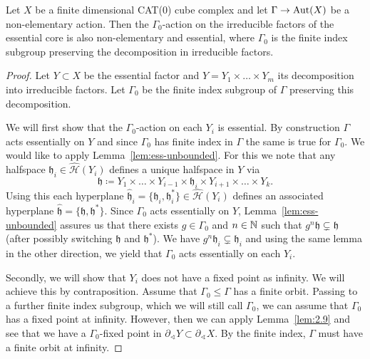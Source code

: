 \begin{lemma}[{\cite[Lemma~2.28]{MR3509968}}]
  \label{lem:2.28}
  Let \(X\) be a finite dimensional CAT(0) cube complex and let \(\Gamma \to \operatorname{Aut}(X)\) be a non-elementary action. Then the \(\Gamma_0\)-action on the irreducible factors of the essential core is also non-elementary and essential, where \(\Gamma_0\) is the finite index subgroup preserving the decomposition in irreducible factors.
\end{lemma}

\begin{proof}
  Let \(Y \subset X\) be the essential factor and \(Y = Y_1 \times \dots \times Y_m\) its decomposition into irreducible factors. Let \(\Gamma_0\) be the finite index subgroup of \(\Gamma\) preserving this decomposition.

  We will first show that the \(\Gamma_0\)-action on each \(Y_i\) is essential. By construction \(\Gamma\) acts essentially on \(Y\) and since \(\Gamma_0\) has finite index in \(\Gamma\) the same is true for \(\Gamma_0\). We would like to apply Lemma~\ref{lem:ess-unbounded}. For this we note that any halfspace \(\mathfrak{h}_i \in \mathcal{\hat H}(Y_i)\) defines a unique halfspace in \(Y\) via
  \[
    \mathfrak{h} \coloneqq Y_1 \times \dots \times Y_{i-1} \times \mathfrak{h}_i \times Y_{i+1} \times \dots \times Y_k.
  \]
  Using this each hyperplane \(\mathfrak{\hat h}_i = \{\mathfrak{h}_i , \mathfrak{h}_i^\ast\} \in \mathcal{\hat H}(Y_i)\) defines an associated hyperplane \(\mathfrak{\hat h} = \{\mathfrak{h}, \mathfrak{h}^\ast\}\). Since \(\Gamma_0\) acts essentially on \(Y\), Lemma~\ref{lem:ess-unbounded} assures us that there exists \(g \in \Gamma_0\) and \(n \in \mathbb{N}\) such that \(g^n \mathfrak{h} \subsetneq \mathfrak{h}\) (after possibly switching \(\mathfrak{h}\) and \(\mathfrak{h}^\ast\)). We have \(g^n \mathfrak{h}_i \subsetneq \mathfrak{h}_i\) and using the same lemma in the other direction, we yield that \(\Gamma_0\) acts essentially on each \(Y_i\).

  Secondly, we will show that \(Y_i\) does not have a fixed point as infinity. We will achieve this by contraposition. Assume that \(\Gamma_0 \leq \Gamma\) has a finite orbit. Passing to a further finite index subgroup, which we will still call \(\Gamma_0\), we can assume that \(\Gamma_0\) has a fixed point at infinity. However, then we can apply Lemma~\ref{lem:2.9} and see that we have a \(\Gamma_0\)-fixed point in \(\partial_\sphericalangle Y \subset \partial_\sphericalangle X\). By the finite index, \(\Gamma\) must have a finite orbit at infinity.
\end{proof}


